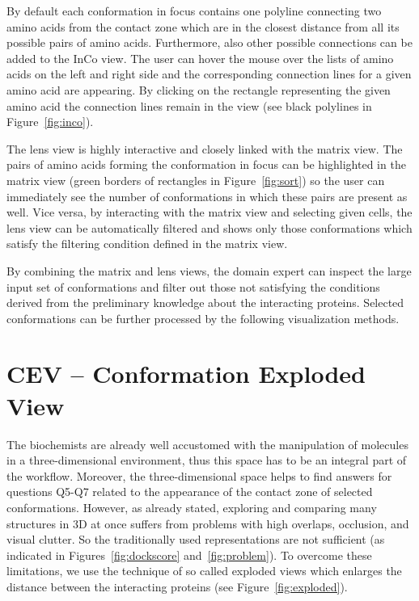 \documentclass[journal]{vgtc}                %
\begin{document}
By default each conformation in focus contains one polyline connecting two amino acids from the contact zone which are in the closest distance from all its possible pairs of amino acids.
Furthermore, also other possible connections can be added to the InCo view.
The user can hover the mouse over the lists of amino acids on the left and right side and the corresponding connection lines for a given amino acid are appearing.
By clicking on the rectangle representing the given amino acid the connection lines remain in the view (see black polylines in Figure~\ref{fig:inco}).

The lens view is highly interactive and closely linked with the matrix view.
The pairs of amino acids forming the conformation in focus can be highlighted in the matrix view (green borders of rectangles in Figure~\ref{fig:sort}) so the user can immediately see the number of conformations in which these pairs are present as well.
Vice versa, by interacting with the matrix view and selecting given cells, the lens view can be automatically filtered and shows only those conformations which satisfy the filtering condition defined in the matrix view.

By combining the matrix and lens views, the domain expert can inspect the large input set of conformations and filter out those not satisfying the conditions derived from the preliminary knowledge about the interacting proteins.
Selected conformations can be further processed by the following visualization methods.

\section{CEV -- Conformation Exploded View}
The biochemists are already well accustomed with the manipulation of molecules in a three-dimensional environment, thus this space has to be an integral part of the workflow.
Moreover, the three-dimensional space helps to find answers for questions Q5-Q7 related to the appearance of the contact zone of selected conformations.
However, as already stated, exploring and comparing many structures in 3D at once suffers from problems with high overlaps, occlusion, and visual clutter. 
So the traditionally used representations are not sufficient (as indicated in Figures~\ref{fig:dockscore} and~\ref{fig:problem}).
To overcome these limitations, we use the technique of so called exploded views which enlarges the distance between the interacting proteins (see Figure~\ref{fig:exploded}). 
\end{document}
